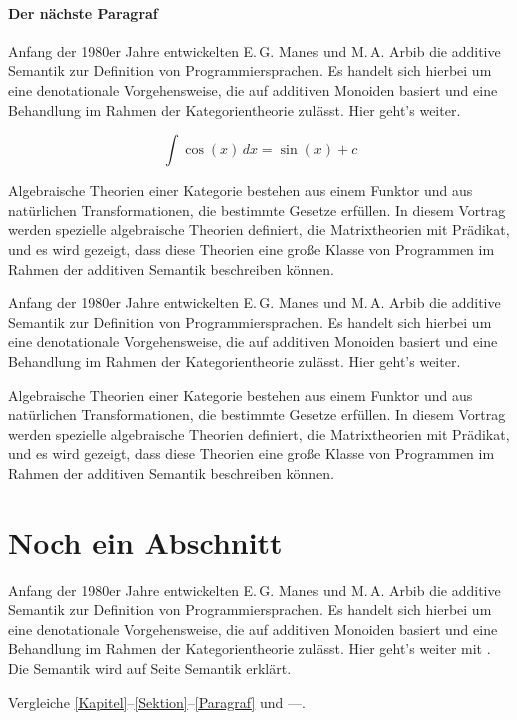 \paragraph{Der nächste Paragraf}

Anfang der 1980er Jahre entwickelten E.\,G. Manes und M.\,A. Arbib die
additive Semantik zur Definition von Programmiersprachen. Es handelt
sich hierbei um eine denotationale Vorgehensweise, die auf additiven
Monoiden basiert und eine Behandlung im Rahmen der Kategorientheorie
zulässt. Hier geht's weiter.\algtheorie

$$\int \cos(x)\,dx = \sin(x)+c$$

Algebraische Theorien einer Kategorie bestehen aus einem Funktor und
aus natürlichen Transformationen, die bestimmte Gesetze erfüllen. In
diesem Vortrag werden spezielle algebraische Theorien definiert, die
Matrixtheorien mit Prädikat, und es wird gezeigt, dass diese Theorien
eine große Klasse von Programmen im Rahmen der additiven Semantik
beschreiben können.

Anfang der 1980er Jahre entwickelten E.\,G. Manes und M.\,A. Arbib die
additive Semantik zur Definition von Programmiersprachen. Es handelt
sich hierbei um eine denotationale Vorgehensweise, die auf additiven
Monoiden basiert und eine Behandlung im Rahmen der Kategorientheorie
zulässt. Hier geht's weiter.

Algebraische Theorien einer Kategorie bestehen aus einem Funktor und
aus natürlichen Transformationen, die bestimmte Gesetze erfüllen. In
diesem Vortrag werden spezielle algebraische Theorien definiert, die
Matrixtheorien mit Prädikat, und es wird gezeigt, dass diese Theorien
eine große Klasse von Programmen im Rahmen der additiven Semantik
beschreiben können.

\section{Noch ein Abschnitt}

Anfang der 1980er Jahre entwickelten E.\,G. Manes und M.\,A. Arbib die
additive Semantik zur Definition von Programmiersprachen. Es handelt
sich hierbei um eine denotationale Vorgehensweise, die auf additiven
Monoiden basiert und eine Behandlung im Rahmen der Kategorientheorie
zulässt. Hier geht's weiter mit \cite{lit01}. Die Semantik wird auf Seite
Semantik erklärt.

Vergleiche \ref{Kapitel}--\ref{Sektion}--\ref{Paragraf} und
\pageref{Kapitel}--\pageref{Sektion}--\pageref{Paragraf}.

